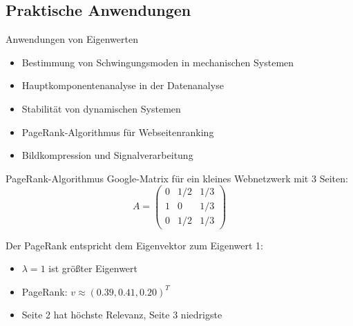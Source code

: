 \subsection{Praktische Anwendungen}

\begin{concept}{Anwendungen von Eigenwerten}
\begin{itemize}
    \item Bestimmung von Schwingungsmoden in mechanischen Systemen
    \item Hauptkomponentenanalyse in der Datenanalyse
    \item Stabilität von dynamischen Systemen
    \item PageRank-Algorithmus für Webseitenranking
    \item Bildkompression und Signalverarbeitung
\end{itemize}
\end{concept}

\begin{example2}{PageRank-Algorithmus}
Google-Matrix für ein kleines Webnetzwerk mit 3 Seiten:
$$A = \begin{pmatrix}
0 & 1/2 & 1/3\\
1 & 0 & 1/3\\
0 & 1/2 & 1/3
\end{pmatrix}$$

Der PageRank entspricht dem Eigenvektor zum Eigenwert 1:
\begin{itemize}
    \item $\lambda = 1$ ist größter Eigenwert
    \item PageRank: $v \approx (0.39, 0.41, 0.20)^T$
    \item Seite 2 hat höchste Relevanz, Seite 3 niedrigste
\end{itemize}
\end{example2}

